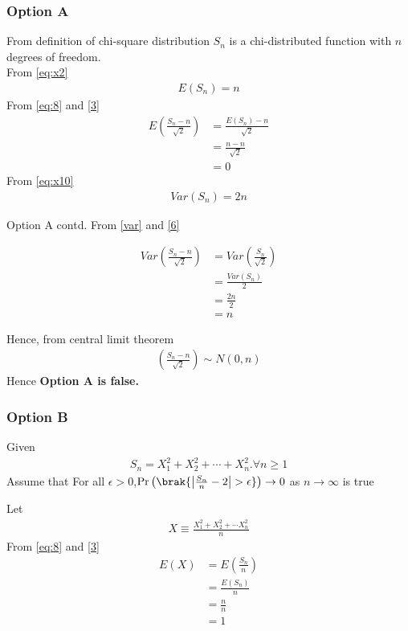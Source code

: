 \documentclass{beamer}
\providecommand{\pr}[1]{\ensuremath{\Pr\left(#1\right)}}
\begin{document}
\begin{frame}
\frametitle{Option A}
From definition of chi-square distribution $S_n$ is a chi-distributed function with $n$ degrees of freedom.\\
From \eqref{eq:x2} 
\begin{align}
    E(S_n)=n \label{eq:8}
\end{align}
From \eqref{eq:8} and \eqref{3}
\begin{align}
    E\left(\frac{S_{n}-n}{\sqrt{2}}\right)&=\frac{E(S_n)-n}{\sqrt{2}}\\
     &=\frac{n-n}{\sqrt{2}}\\
    &=0
\end{align}
From \eqref{eq:x10}
\begin{align}
    Var(S_n)= 2n\label{var}
\end{align}
\end{frame}
\begin{frame}{Option A contd.}
From \eqref{var} and \eqref{6}

\begin{align}
    Var\left(\frac{S_{n}-n}{\sqrt{2}}\right)
    &= Var\left(\frac{S_n}{\sqrt{2}}\right)\\
    &=\frac{Var(S_n)}{2}\\
    &=\frac{2n}{2}\\
    &=n
\end{align}

Hence, from central limit theorem
\begin{align}
    \left(\frac{S_{n}-n}{\sqrt{2}}\right)\sim N(0,n)
\end{align}
Hence \textbf{Option A is false.}
\end{frame}



\begin{frame}
\frametitle{Option B}
Given 
\begin{align}
    S_{n}=X_{1}^2+X_{2}^2+\cdots+X_{n}^2.\forall n\geq 1
\end{align}
Assume that For all $\epsilon > 0$,$\pr{\brak{\left|{\frac{S_n}{n}-2}\right|>\epsilon}}\to 0$ as $n \to \infty$ is true

Let
\begin{align}
    X \equiv \frac{X_{1}^2+X_{2}^2+\cdots X_{n}^2}{n}
\end{align}
From \eqref{eq:8} and \eqref{3}
\begin{align}
    E(X)&=E\left(\frac{S_n}{n}\right)\\
        &=\frac{E(S_n)}{n}\\
        &=\frac{n}{n}\\
        &=1\label{25}
\end{align}
\end{frame}
\end{document}

